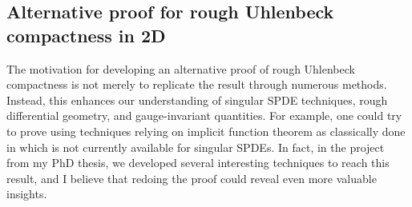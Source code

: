 \documentclass[11pt]{article}
\numberwithin{equation}{section}
\theoremstyle{definition}
\theoremstyle{remark}
\newcommand{\diff}{\mathrm{d}}
\newcommand{\1}{\mathbf 1}
\newcommand{\<}{\langle}
\renewcommand{\>}{\rangle}
\newcommand{\orange}[1]{\textcolor{orange}{#1}}
\begin{document}




\subsection{Alternative proof for rough Uhlenbeck compactness in 2D}




The motivation for developing an alternative proof of rough Uhlenbeck compactness is not merely to replicate the result through numerous methods. Instead, this enhances our understanding of singular SPDE techniques, rough differential geometry, and gauge-invariant quantities. For example, one could try to prove using techniques relying on implicit function theorem as classically done in \cite{Uhlenbeck82} which is not currently available for singular SPDEs.
%
%
In fact, in the project  from my PhD thesis, we developed several interesting techniques to reach this result, and I believe that redoing the proof could reveal even more valuable insights.
\end{document}
